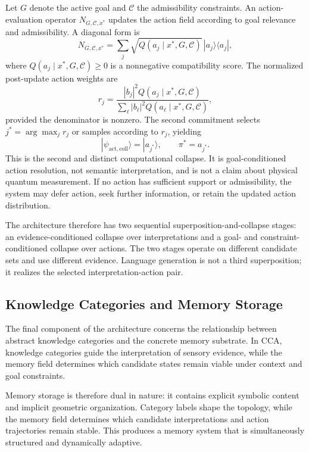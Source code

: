 \documentclass[10pt,journal,compsoc]{IEEEtran}
\begin{document}
Let $G$ denote the active goal and $\mathcal{C}$ the admissibility constraints. An action-evaluation operator $N_{G,\mathcal{C},x^{\ast}}$ updates the action field according to goal relevance and admissibility. A diagonal form is
\[
N_{G,\mathcal{C},x^{\ast}} = \sum_j \sqrt{Q(a_j\mid x^{\ast},G,\mathcal{C})}\,|a_j\rangle\langle a_j|,
\]
where $Q(a_j\mid x^{\ast},G,\mathcal{C})\geq 0$ is a nonnegative compatibility score. The normalized post-update action weights are
\[
r_j = \frac{|b_j|^2 Q(a_j\mid x^{\ast},G,\mathcal{C})}
{\sum_\ell |b_\ell|^2 Q(a_\ell\mid x^{\ast},G,\mathcal{C})},
\]
provided the denominator is nonzero. The second commitment selects $j^{\ast}=\arg\max_j r_j$ or samples according to $r_j$, yielding
\[
|\psi_{\mathrm{act,coll}}\rangle = |a_{j^{\ast}}\rangle,
\qquad \pi^{\ast}=a_{j^{\ast}}.
\]
This is the second and distinct computational collapse. It is goal-conditioned action resolution, not semantic interpretation, and is not a claim about physical quantum measurement. If no action has sufficient support or admissibility, the system may defer action, seek further information, or retain the updated action distribution.

The architecture therefore has two sequential superposition-and-collapse stages: an evidence-conditioned collapse over interpretations and a goal- and constraint-conditioned collapse over actions. The two stages operate on different candidate sets and use different evidence. Language generation is not a third superposition; it realizes the selected interpretation-action pair.

\subsection{Knowledge Categories and Memory Storage}

The final component of the architecture concerns the relationship between abstract knowledge categories and the concrete memory substrate. In CCA, knowledge categories guide the interpretation of sensory evidence, while the memory field determines which candidate states remain viable under context and goal constraints.

Memory storage is therefore dual in nature: it contains explicit symbolic content and implicit geometric organization. Category labels shape the topology, while the memory field determines which candidate interpretations and action trajectories remain stable. This produces a memory system that is simultaneously structured and dynamically adaptive.
\end{document}
